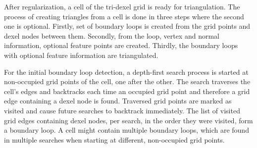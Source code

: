 After regularization, a cell of the tri-dexel grid is ready for triangulation.
The process of creating triangles from a cell is done in three steps where the second one is optional.
Firstly, set of boundary loops is created from the grid points and dexel nodes between them.
Secondly, from the loop, vertex and normal information, optional feature points are created.
Thirdly, the boundary loops with optional feature information are triangulated.

For the initial boundary loop detection, a depth-first search process is started at non-occupied grid points of the cell, one after the other.
The search traverses the cell's edges and backtracks each time an occupied grid point and therefore a grid edge containing a dexel node is found.
Traversed grid points are marked as visited and cause future searches to backtrack immediately.
The list of visited grid edges containing dexel nodes, per search, in the order they were visited, form a boundary loop.
A cell might contain multiple boundary loops, which are found in multiple searches when starting at different, non-occupied grid points.

